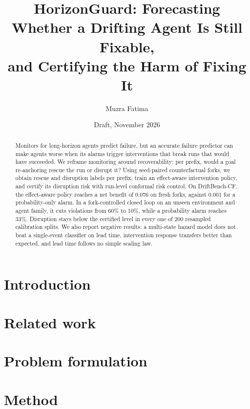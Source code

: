 \documentclass[11pt]{article}
\title{HorizonGuard: Forecasting Whether a Drifting Agent Is Still Fixable,\\
and Certifying the Harm of Fixing It}
\author{Muzra Fatima}
\date{Draft, November 2026}
\begin{document}
\maketitle

\begin{abstract}
Monitors for long-horizon agents predict failure, but an accurate failure predictor can make agents
worse when its alarms trigger interventions that break runs that would have succeeded. We reframe
monitoring around recoverability: per prefix, would a goal re-anchoring rescue the run or disrupt it?
Using seed-paired counterfactual forks, we obtain rescue and disruption labels per prefix, train an
effect-aware intervention policy, and certify its disruption risk with run-level conformal risk control.
On DriftBench-CF, the effect-aware policy reaches a net benefit of 0.076 on fresh forks, against 0.001 for a
probability-only alarm. In a fork-controlled closed loop on an unseen environment and agent family, it cuts
violations from 60\% to 10\%, while a probability alarm reaches 33\%. Disruption stays below the
certified level in every one of 200 resampled calibration splits. We also report negative results: a
multi-state hazard model does not beat a single-event classifier on lead time, intervention response
transfers better than expected, and lead time follows no simple scaling law.
\end{abstract}

\section{Introduction}

\section{Related work}

\section{Problem formulation}

\section{Method}
\end{document}
